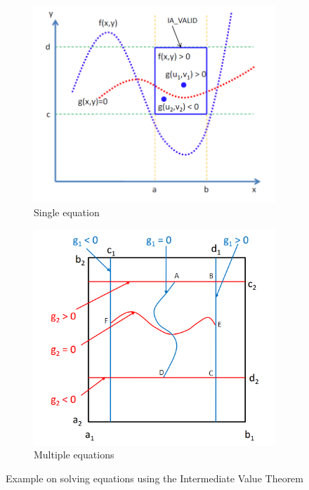 \documentclass[runningheads,a4paper,oribibl]{llncs}
\begin{document}
\begin{figure}
\centering
\begin{subfigure}{0.4\textwidth}
\includegraphics[width=1.\linewidth]{singleEquation.png} 
\caption{Single equation}
\label{fig:single-equation}
\end{subfigure}
\begin{subfigure}{0.4\textwidth}
\includegraphics[width=1.\linewidth]{multipleEquations.png}  
\caption{Multiple equations}
\label{fig:multiple-equations}  
\end{subfigure}
\caption{Example on solving equations using the Intermediate Value Theorem}
\end{figure}
\end{document}
